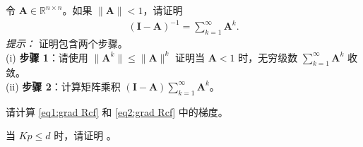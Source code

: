 \documentclass[../../book-main.tex]{subfiles}
\begin{document}
\begin{exercise}[矩阵逆的诺伊曼级数]\label{ex:neumannn}
令 $\bm A \in \mathbb{R}^{n\times n}$。如果 $\|\bm A\| < 1$，请证明
\begin{align}\label{eq:neumann}
    \left( \bm I - \bm A\right)^{-1} = \sum_{k=1}^\infty \bm A^k.
\end{align}
{\em 提示：} 证明包含两个步骤。\\
(i) {\bf 步骤 1}：请使用 $\|\bm A^k\| \le \|\bm A\|^k$ 证明当 $\bm A < 1$ 时，无穷级数 $\sum_{k=1}^\infty \bm A^k$ 收敛。\\
(ii) {\bf 步骤 2}：计算矩阵乘积 $(\bm I - \bm A) \sum_{k=1}^\infty \bm A^k$。
\end{exercise}


\begin{exercise}
    请计算 \eqref{eq1:grad Rcf} 和 \eqref{eq2:grad Rcf} 中的梯度。
\end{exercise}


\begin{exercise}
    当 $Kp \le d$ 时，请证明 。
\end{exercise}
\end{document}
